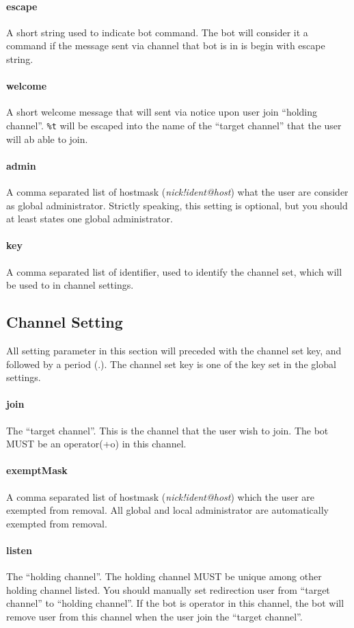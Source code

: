 \documentclass[a4paper,12pt,titlepage]{article}
\begin{document}
\paragraph{escape} A short string used to indicate bot command. The bot will consider it a command if the message sent via channel that bot is in is begin with escape string.
\paragraph{welcome} A short welcome message that will sent via notice upon user join ``holding channel''. \texttt{\%t} will be escaped into the name of the ``target channel'' that the user will ab able to join.
\paragraph{admin} A comma separated list of hostmask (\textit{nick!ident@host}) what the user are consider as global administrator. Strictly speaking, this setting is optional, but you should at least states one global administrator.
\paragraph{key} A comma separated list of identifier, used to identify the channel set, which will be used to in channel settings. 
\subsection{Channel Setting}
All setting parameter in this section will preceded with the channel set key, and followed by a period (.). The channel set key is one of the key set in the global settings.
\paragraph{join} The ``target channel''. This is the channel that the user wish to join. The bot MUST be an operator(+o) in this channel.
\paragraph{exemptMask} A comma separated list of hostmask (\textit{nick!ident@host}) which the user are exempted from removal. All global and local administrator are automatically exempted from removal.
\paragraph{listen} The ``holding channel''. The holding channel MUST be unique among other holding channel listed. You should manually set redirection user from  ``target channel'' to ``holding channel''. If the bot is operator in this channel, the bot will remove user from this channel when the user join the ``target channel''.
\end{document}
